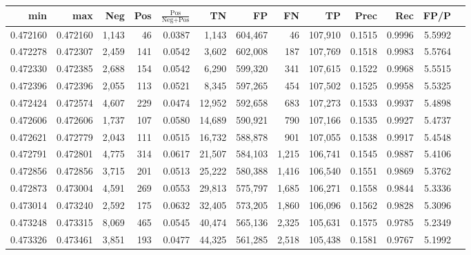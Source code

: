 \begin{tabular}{rrrrrrrrrrrrr}
\toprule
     min &      max &   Neg &   Pos & $\frac{\text{Pos}}{\text{Neg}+\text{Pos}}$ &      TN &      FP &      FN &      TP &   Prec &    Rec &   FP/P \\
\midrule
0.472160 & 0.472160 & 1,143 &    46 &                                     0.0387 &   1,143 & 604,467 &      46 & 107,910 & 0.1515 & 0.9996 & 5.5992 \\
0.472278 & 0.472307 & 2,459 &   141 &                                     0.0542 &   3,602 & 602,008 &     187 & 107,769 & 0.1518 & 0.9983 & 5.5764 \\
0.472330 & 0.472385 & 2,688 &   154 &                                     0.0542 &   6,290 & 599,320 &     341 & 107,615 & 0.1522 & 0.9968 & 5.5515 \\
0.472396 & 0.472396 & 2,055 &   113 &                                     0.0521 &   8,345 & 597,265 &     454 & 107,502 & 0.1525 & 0.9958 & 5.5325 \\
0.472424 & 0.472574 & 4,607 &   229 &                                     0.0474 &  12,952 & 592,658 &     683 & 107,273 & 0.1533 & 0.9937 & 5.4898 \\
0.472606 & 0.472606 & 1,737 &   107 &                                     0.0580 &  14,689 & 590,921 &     790 & 107,166 & 0.1535 & 0.9927 & 5.4737 \\
0.472621 & 0.472779 & 2,043 &   111 &                                     0.0515 &  16,732 & 588,878 &     901 & 107,055 & 0.1538 & 0.9917 & 5.4548 \\
0.472791 & 0.472801 & 4,775 &   314 &                                     0.0617 &  21,507 & 584,103 &   1,215 & 106,741 & 0.1545 & 0.9887 & 5.4106 \\
0.472856 & 0.472856 & 3,715 &   201 &                                     0.0513 &  25,222 & 580,388 &   1,416 & 106,540 & 0.1551 & 0.9869 & 5.3762 \\
0.472873 & 0.473004 & 4,591 &   269 &                                     0.0553 &  29,813 & 575,797 &   1,685 & 106,271 & 0.1558 & 0.9844 & 5.3336 \\
0.473014 & 0.473240 & 2,592 &   175 &                                     0.0632 &  32,405 & 573,205 &   1,860 & 106,096 & 0.1562 & 0.9828 & 5.3096 \\
0.473248 & 0.473315 & 8,069 &   465 &                                     0.0545 &  40,474 & 565,136 &   2,325 & 105,631 & 0.1575 & 0.9785 & 5.2349 \\
0.473326 & 0.473461 & 3,851 &   193 &                                     0.0477 &  44,325 & 561,285 &   2,518 & 105,438 & 0.1581 & 0.9767 & 5.1992 \\

\end{tabular}
